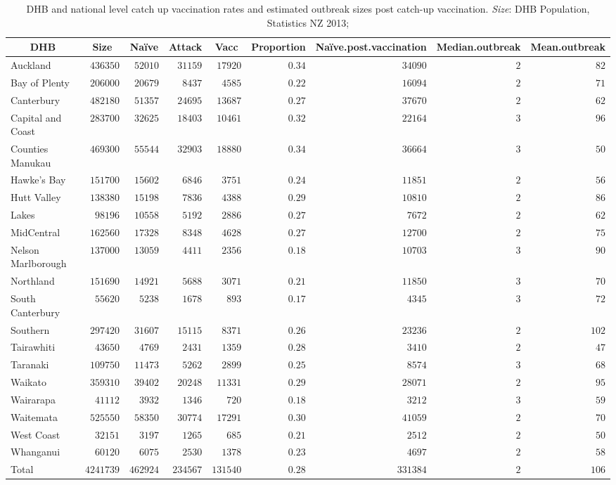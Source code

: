 \documentclass{article}
\begin{document}
\begin{table}\small
\begin{center}
\begin{tabular}{lrrrrrrrr}
\hline\hline
\multicolumn{1}{c}{DHB}&\multicolumn{1}{c}{Size}&\multicolumn{1}{c}{Naïve}&\multicolumn{1}{c}{Attack}&\multicolumn{1}{c}{Vacc}&\multicolumn{1}{c}{Proportion}&\multicolumn{1}{c}{Naïve.post.vaccination}&\multicolumn{1}{c}{Median.outbreak}&\multicolumn{1}{c}{Mean.outbreak}\tabularnewline
\hline
Auckland&$ 436350$&$ 52010$&$ 31159$&$ 17920$&$0.34$&$ 34090$&$2$&$ 82$\tabularnewline
Bay of Plenty&$ 206000$&$ 20679$&$  8437$&$  4585$&$0.22$&$ 16094$&$2$&$ 71$\tabularnewline
Canterbury&$ 482180$&$ 51357$&$ 24695$&$ 13687$&$0.27$&$ 37670$&$2$&$ 62$\tabularnewline
Capital and Coast&$ 283700$&$ 32625$&$ 18403$&$ 10461$&$0.32$&$ 22164$&$3$&$ 96$\tabularnewline
Counties Manukau&$ 469300$&$ 55544$&$ 32903$&$ 18880$&$0.34$&$ 36664$&$3$&$ 50$\tabularnewline
Hawke's Bay&$ 151700$&$ 15602$&$  6846$&$  3751$&$0.24$&$ 11851$&$2$&$ 56$\tabularnewline
Hutt Valley&$ 138380$&$ 15198$&$  7836$&$  4388$&$0.29$&$ 10810$&$2$&$ 86$\tabularnewline
Lakes&$  98196$&$ 10558$&$  5192$&$  2886$&$0.27$&$  7672$&$2$&$ 62$\tabularnewline
MidCentral&$ 162560$&$ 17328$&$  8348$&$  4628$&$0.27$&$ 12700$&$2$&$ 75$\tabularnewline
Nelson Marlborough&$ 137000$&$ 13059$&$  4411$&$  2356$&$0.18$&$ 10703$&$3$&$ 90$\tabularnewline
Northland&$ 151690$&$ 14921$&$  5688$&$  3071$&$0.21$&$ 11850$&$3$&$ 70$\tabularnewline
South Canterbury&$  55620$&$  5238$&$  1678$&$   893$&$0.17$&$  4345$&$3$&$ 72$\tabularnewline
Southern&$ 297420$&$ 31607$&$ 15115$&$  8371$&$0.26$&$ 23236$&$2$&$102$\tabularnewline
Tairawhiti&$  43650$&$  4769$&$  2431$&$  1359$&$0.28$&$  3410$&$2$&$ 47$\tabularnewline
Taranaki&$ 109750$&$ 11473$&$  5262$&$  2899$&$0.25$&$  8574$&$3$&$ 68$\tabularnewline
Waikato&$ 359310$&$ 39402$&$ 20248$&$ 11331$&$0.29$&$ 28071$&$2$&$ 95$\tabularnewline
Wairarapa&$  41112$&$  3932$&$  1346$&$   720$&$0.18$&$  3212$&$3$&$ 59$\tabularnewline
Waitemata&$ 525550$&$ 58350$&$ 30774$&$ 17291$&$0.30$&$ 41059$&$2$&$ 70$\tabularnewline
West Coast&$  32151$&$  3197$&$  1265$&$   685$&$0.21$&$  2512$&$2$&$ 50$\tabularnewline
Whanganui&$  60120$&$  6075$&$  2530$&$  1378$&$0.23$&$  4697$&$2$&$ 58$\tabularnewline
Total&$4241739$&$462924$&$234567$&$131540$&$0.28$&$331384$&$2$&$106$\tabularnewline
\hline
\end{tabular}\end{center}\caption{DHB and national level catch up vaccination rates and estimated outbreak sizes post catch-up vaccination. \textit{Size}: DHB Population, Statistics NZ 2013;    
}
\end{table}
\end{document}
